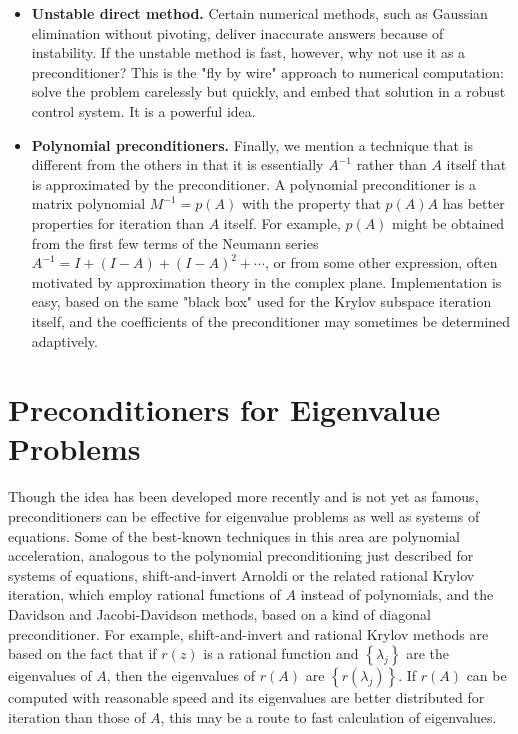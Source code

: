 \begin{itemize}
    \item \textbf{Unstable direct method.} Certain numerical methods, such as Gaussian elimination without pivoting, deliver inaccurate answers because of instability. If the unstable method is fast, however, why not use it as a preconditioner? This is the "fly by wire" approach to numerical computation: solve the problem carelessly but quickly, and embed that solution in a robust control system. It is a powerful idea.
    \item \textbf{Polynomial preconditioners.} Finally, we mention a technique that is different from the others in that it is essentially $A^{-1}$ rather than $A$ itself that is approximated by the preconditioner. A polynomial preconditioner is a matrix polynomial $M^{-1}=p(A)$ with the property that $p(A) A$ has better properties for iteration than $A$ itself. For example, $p(A)$ might be obtained from the first few terms of the Neumann series $A^{-1}=I+(I-A)+(I-A)^2+\cdots$, or from some other expression, often motivated by approximation theory in the complex plane. Implementation is easy, based on the same "black box" used for the Krylov subspace iteration itself, and the coefficients of the preconditioner may sometimes be determined adaptively.
\end{itemize} 
\section{Preconditioners for Eigenvalue Problems} 
Though the idea has been developed more recently and is not yet as famous, preconditioners can be effective for eigenvalue problems as well as systems of equations. Some of the best-known techniques in this area are polynomial acceleration, analogous to the polynomial preconditioning just described for systems of equations, shift-and-invert Arnoldi or the related rational Krylov iteration, which employ rational functions of $A$ instead of polynomials, and the Davidson and Jacobi-Davidson methods, based on a kind of diagonal preconditioner. For example, shift-and-invert and rational Krylov methods are based on the fact that if $r(z)$ is a rational function and $\left\{\lambda_j\right\}$ are the eigenvalues of $A$, then the eigenvalues of $r(A)$ are $\left\{r\left(\lambda_j\right)\right\}$. If $r(A)$ can be computed with reasonable speed and its eigenvalues are better distributed for iteration than those of $A$, this may be a route to fast calculation of eigenvalues.
